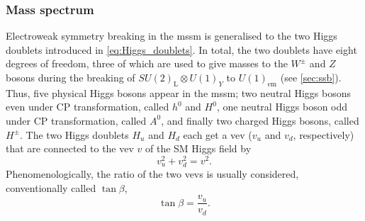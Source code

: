 \subsubsection{Mass spectrum}

Electroweak symmetry breaking in the \gls{mssm} is generalised to the two Higgs doublets introduced in \cref{eq:Higgs_doublets}. In total, the two doublets have eight degrees of freedom, three of which are used to give masses to the $W^\pm$ and $Z$ bosons during the breaking of $SU(2)_\mathrm{L}\otimes U(1)_Y$ to $U(1)_\mathrm{em}$ (see \cref{sec:ssb}). Thus, five physical Higgs bosons appear in the \gls{mssm}; two neutral Higgs bosons even under CP transformation, called $h^0$ and $H^0$, one neutral Higgs boson odd under CP transformation, called $A^0$, and finally two charged Higgs bosons, called $H^\pm$. The two Higgs doublets $H_u$ and $H_d$ each get a \gls{vev} ($v_u$ and $v_d$, respectively) that are connected to the \gls{vev} $v$ of the SM Higgs field by
\begin{equation}
	v_u^2 + v_d^2 = v^2.
\end{equation}
Phenomenologically, the ratio of the two \glspl{vev} is usually considered, conventionally called $\tan{\beta}$,
\begin{equation}
	\tan{\beta} = \frac{v_u}{v_d}.
\end{equation}

